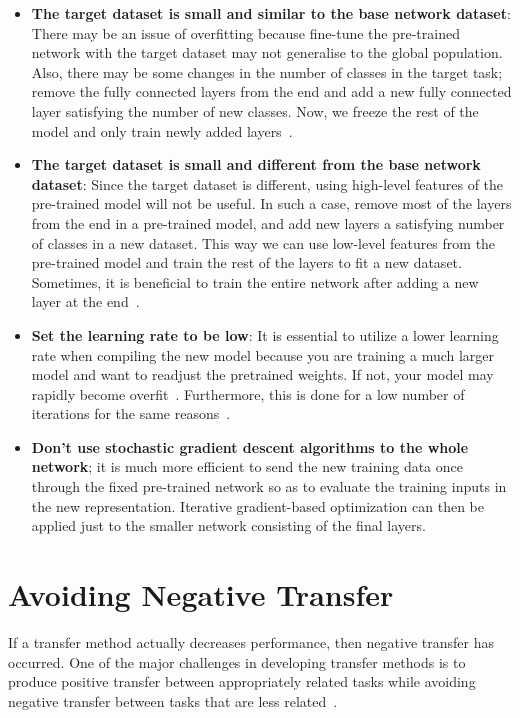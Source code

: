 \documentclass[11pt]{article}
\begin{document}
\begin{itemize}
    \item \textbf{The target dataset is small and similar to the base network dataset}: There may be an issue of overfitting because fine-tune the pre-trained network with the target dataset may not generalise to the global population. Also, there may be some changes in the number of classes in the target task; remove the fully connected layers from the end and add a new fully connected layer satisfying the number of new classes. Now, we freeze the rest of the model and only train newly added layers~\cite{geeks-transfer-learning}.
    \item \textbf{The target dataset is small and different from the base network dataset}: Since the target dataset is different, using high-level features of the pre-trained model will not be useful. In such a case, remove most of the layers from the end in a pre-trained model, and add new layers a satisfying number of classes in a new dataset. This way we can use low-level features from the pre-trained model and train the rest of the layers to fit a new dataset. Sometimes, it is beneficial to train the entire network after adding a new layer at the end~\cite{geeks-transfer-learning}.
    \item \textbf{Set the learning rate to be low}: It is essential to utilize a lower learning rate when compiling the new model because you are training a much larger model and want to readjust the pretrained weights. If not, your model may rapidly become overfit~\cite{geeks-transfer-learning}. Furthermore, this is done for a low number of iterations for the same reasons~\cite{deep-learning-book}.
    \item \textbf{Don't use stochastic gradient descent algorithms to the whole network}; it is much more efficient to send the new training data once through the fixed pre-trained network so as to evaluate the training inputs in the new representation. Iterative gradient-based optimization can then be applied just to the smaller network consisting of the final     layers.
\end{itemize}

\section{Avoiding Negative Transfer}\label{sec:negative-transfer}

If a transfer method actually decreases performance, then negative transfer has occurred. One of the major challenges in developing transfer methods is to produce positive transfer between appropriately related tasks while avoiding negative transfer between tasks that are less related~\cite{torrey-handbook}.
\end{document}
